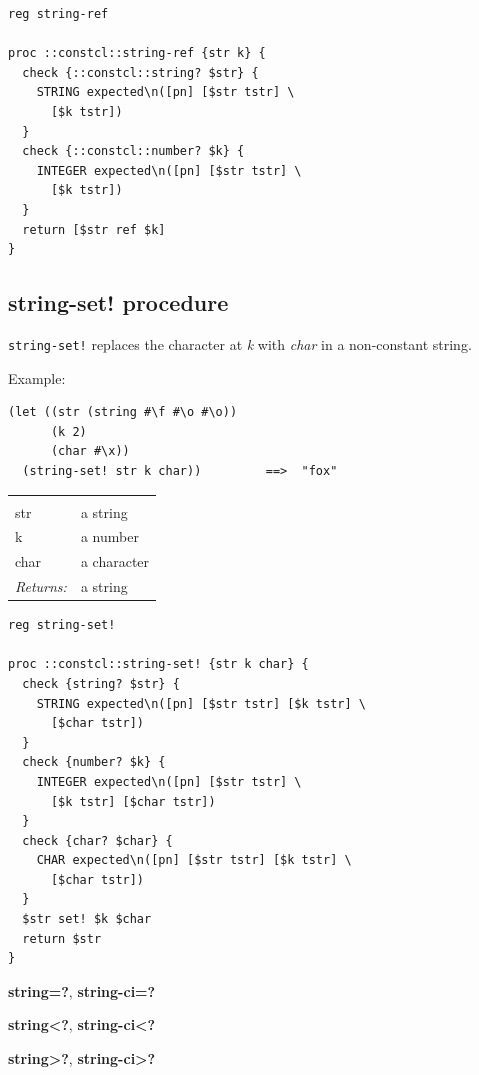 \documentclass[a5paper,draft]{memoir}
\begin{document}
\begin{lstlisting}
reg string-ref

proc ::constcl::string-ref {str k} {
  check {::constcl::string? $str} {
    STRING expected\n([pn] [$str tstr] \
      [$k tstr])
  }
  check {::constcl::number? $k} {
    INTEGER expected\n([pn] [$str tstr] \
      [$k tstr])
  }
  return [$str ref $k]
}
\end{lstlisting}

\subsection{string-set! procedure}
\label{stringset-procedure}

\texttt{string-set!} replaces the character at \emph{k} with \emph{char} in a non-constant string.

Example:

\begin{verbatim}
(let ((str (string #\f #\o #\o))
      (k 2)
      (char #\x))
  (string-set! str k char))         ==>  "fox"
\end{verbatim}

\noindent\begin{tabular}{ |p{1.9cm} p{6.5cm}| }
\hline
\rowcolor[HTML]{CCCCCC} \multicolumn{2}{|l|}{\textbf{string-set! (public)}} \\
str & a string \\
k & a number \\
char & a character \\
\textit{Returns:} & a string \\
\hline
\end{tabular}

\begin{lstlisting}
reg string-set!

proc ::constcl::string-set! {str k char} {
  check {string? $str} {
    STRING expected\n([pn] [$str tstr] [$k tstr] \
      [$char tstr])
  }
  check {number? $k} {
    INTEGER expected\n([pn] [$str tstr] \
      [$k tstr] [$char tstr])
  }
  check {char? $char} {
    CHAR expected\n([pn] [$str tstr] [$k tstr] \
      [$char tstr])
  }
  $str set! $k $char
  return $str
}
\end{lstlisting}

\textbf{string=?}, \textbf{string-ci=?}

\textbf{string<?}, \textbf{string-ci<?}

\textbf{string>?}, \textbf{string-ci>?}
\end{document}

